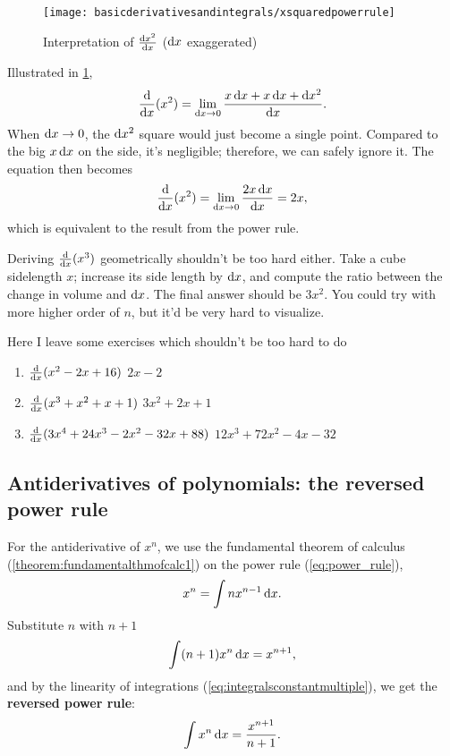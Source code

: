 \begin{figure}[b]
    \centering
    \texttt{[image: basicderivativesandintegrals/xsquaredpowerrule]}
	\caption{Interpretation of $\odv{x^2}{x}$ ($\odif{x}$ exaggerated)}
    \label{fig:xsquaredpowerrule}
\end{figure}
Illustrated in \cref{fig:xsquaredpowerrule},
\begin{equation}
    \odv*{(x^2)}{x} = \lim_{\odif{x} \appr 0} \frac{x\odif{x} + x\odif{x} + \odif{x}^2}{\odif{x}}. \label{eq:xsquaredpowerrule}
\end{equation}
When $\odif{x} \appr 0$, the $\odif{x^2}$ square would just become a single point. Compared to the big $x\odif{x}$ on the side, it's negligible; therefore, we can safely ignore it. The equation then becomes
\begin{align*}
    \odv*{(x^2)}{x} = \lim_{\odif{x} \appr 0}\frac{2x\odif{x}}{\odif{x}} = 2x,
\end{align*}
which is equivalent to the result from the power rule.

Deriving $\odv*{(x^3)}{x}$ geometrically shouldn't be too hard either. Take a cube sidelength $x$; increase its side length by $\odif{x}$, and compute the ratio between the change in volume and $\odif{x}$. The final answer should be $3x^2$. You could try with more higher order of $n$, but it'd be very hard to visualize.

Here I leave some exercises which shouldn't be too hard to do
\begin{enumerate}
    \item $\odv*{(x^2 - 2x + 16)}{x}$ \hfill $2x - 2$
    \item $\odv*{(x^3 + x^2 + x + 1)}{x}$ \hfill $3x^2 + 2x + 1$
    \item $\odv*{(3x^4 + 24x^3 - 2x^2 - 32x + 88)}{x}$ \hfill $12x^3 + 72x^2 - 4x - 32$
\end{enumerate}

\subsection{Antiderivatives of polynomials: the reversed power rule}

For the antiderivative of $x^n$, we use the fundamental theorem of calculus (\cref{theorem:fundamentalthmofcalc1}) on the power rule (\cref{eq:power_rule}),
\begin{equation*}
    x^n = \int nx^{n - 1} \odif{x}.
\end{equation*}
Substitute $n$ with $n + 1$
\begin{equation*}
    \int (n + 1)x^{n}\odif{x} = x^{n + 1},
\end{equation*}
and by the linearity of integrations (\cref{eq:integralsconstantmultiple}), we get the \textbf{reversed power rule}:
\begin{equation}
    \int x^{n}\odif{x} = \frac{x^{n + 1}}{n + 1}.
\end{equation}

